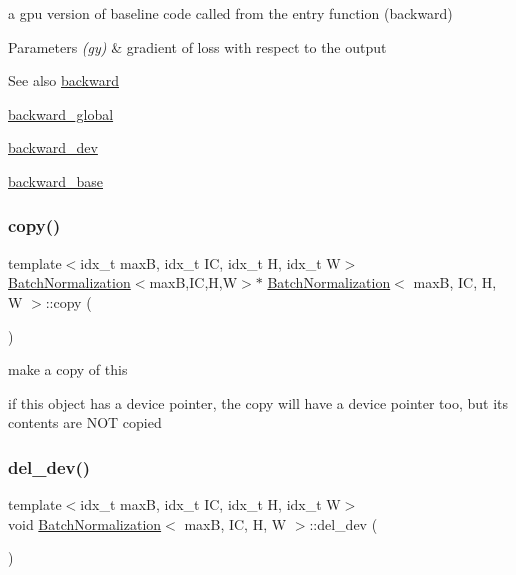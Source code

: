 a gpu version of baseline code called from the entry function (backward) 


\begin{DoxyParams}{Parameters}
{\em (gy)} & gradient of loss with respect to the output \\
\hline
\end{DoxyParams}
\begin{DoxySeeAlso}{See also}
\hyperlink{structBatchNormalization_a3b6d987026effdc6c3a2c99e54ae58f9}{backward} 

\hyperlink{softmaxcrossentropy_8h_a47d56a9a23e08247b227f4aac17413e0}{backward\+\_\+global} 

\hyperlink{structBatchNormalization_a3c96c56393798abdb00647aae73b197a}{backward\+\_\+dev} 

\hyperlink{structBatchNormalization_a0ef45335c50151f68de03d33b1d226ca}{backward\+\_\+base} 
\end{DoxySeeAlso}
\mbox{\label{structBatchNormalization_a328b3e1347324b4fec03662240f39aa5}} 
\subsubsection{\texorpdfstring{copy()}{copy()}}
{\footnotesize\ttfamily template$<$idx\+\_\+t maxB, idx\+\_\+t IC, idx\+\_\+t H, idx\+\_\+t W$>$ \\
\hyperlink{structBatchNormalization}{Batch\+Normalization}$<$maxB,IC,H,W$>$$\ast$ \hyperlink{structBatchNormalization}{Batch\+Normalization}$<$ maxB, IC, H, W $>$\+::copy (\begin{DoxyParamCaption}{ }\end{DoxyParamCaption})\hspace{0.3cm}{\ttfamily [inline]}}



make a copy of this 

if this object has a device pointer, the copy will have a device pointer too, but its contents are N\+OT copied \mbox{\label{structBatchNormalization_a3698340b540985a0cb1d5d2711fc8334}} 
\subsubsection{\texorpdfstring{del\+\_\+dev()}{del\_dev()}}
{\footnotesize\ttfamily template$<$idx\+\_\+t maxB, idx\+\_\+t IC, idx\+\_\+t H, idx\+\_\+t W$>$ \\
void \hyperlink{structBatchNormalization}{Batch\+Normalization}$<$ maxB, IC, H, W $>$\+::del\+\_\+dev (\begin{DoxyParamCaption}{ }\end{DoxyParamCaption})\hspace{0.3cm}{\ttfamily [inline]}}



